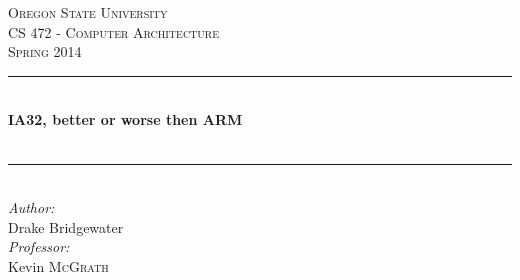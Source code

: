 \documentclass[letterpaper,12pt,titlepage]{article}
\def\name{Drake Bridgewater}
\def\title{IA32, better or worse then ARM}
\def\subtitle{}
\def\subject{CS }
\def\courseNumber{ 472 }
\def\courseName{Computer Architecture }
\def\courseInfo{Spring 2014 }%
\def\supervisor{Kevin \textsc{McGrath}} %
\begin{document}
\begin{titlepage}

\newcommand{\HRule}{\rule{\linewidth}{0.5mm}} %

\center %
 

\textsc{\LARGE Oregon State University}\\[1.5cm] %
\textsc{\Large \subject \courseNumber - \courseName}\\[0.5cm] %
\textsc{\large \courseInfo}\\[0.5cm] %


\HRule \\[0.4cm]
{ \huge \bfseries \title }\\[0.4cm] %
{\small \textit{\subtitle}}\\[0.4cm]
\HRule \\[2.5cm]
 


\emph{Author:}\\
\name \\[2.5cm]

\emph{Professor:} \\
\supervisor\\[4.4cm]




\end{titlepage}
\end{document}
